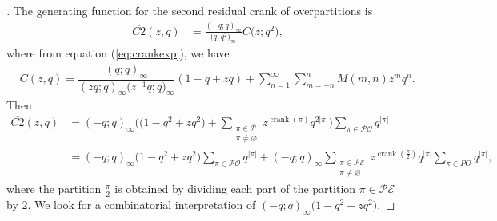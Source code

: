 \documentclass[pdftex]{sigma}
\numberwithin{equation}{section}
\newcommand\eqn[1]{(\ref{eq:#1})}
\begin{document}
\begin{proof}[\unskip\nopunct]
The generating function for the second residual crank of overpartitions is
\begin{align*}
\overline{C2}(z,q)&=\frac{(-q;q)_{\infty}}{\bigl(q;q^2\bigr)_{\infty}}C\bigl(z;q^2\bigr),
\end{align*}
where from equation \eqn{crankexp}, we have
\begin{align*}
&{}C(z,q)=\dfrac{(q;q)_{\infty}}{(zq;q)_{\infty}\bigl(z^{-1}q;q\bigr)_{\infty}}
(1-q+zq)+\sum_{n=1}^\infty \sum_{m=-n}^n  M(m,n) z^m q^n.
\end{align*}
Then
\begin{align*}
\overline{C2}(z,q)&=(-q;q)_{\infty} \biggl(\bigl(1-q^2+zq^2\bigr)+\sum\limits_{\substack{{\pi \in \mathcal{P}}\\ \pi \neq \varnothing}}z^{\operatorname{crank}(\pi)}q^{2 |\pi|}\biggr) \sum_{\pi \in \mathcal{PO}}q^{|\pi|}
\\
&=(-q;q)_{\infty} \bigl(1-q^2+zq^2\bigr)\sum_{\pi \in \mathcal{PO}}q^{|\pi|}+(-q;q)_{\infty} \sum\limits_{\substack{{\pi \in \mathcal{PE}}\\ \pi \neq \varnothing}}z^{\operatorname{crank}(\frac{\pi}{2})}q^{|\pi|} \sum_{\pi \in PO}q^{|\pi|},
\end{align*}
where the partition $\frac{\pi}{2}$ is obtained by dividing each part of the partition $\pi \in \mathcal{PE}$ by $2$. We look for a combinatorial interpretation of $(-q;q)_{\infty}\bigl(1-q^2+zq^2\bigr)$.


\end{proof}
\end{document}
